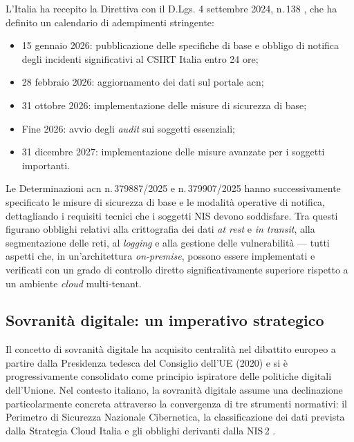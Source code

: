 L'Italia ha recepito la Direttiva con il D.Lgs. 4 settembre 2024, n.\,138 \parencite{DLgs138_2024}, che ha definito un calendario di adempimenti stringente:

\begin{itemize}[noitemsep]
  \item 15 gennaio 2026: pubblicazione delle specifiche di base e obbligo di notifica degli incidenti significativi al CSIRT Italia entro 24 ore;
  \item 28 febbraio 2026: aggiornamento dei dati sul portale \gls{acn};
  \item 31 ottobre 2026: implementazione delle misure di sicurezza di base;
  \item Fine 2026: avvio degli \textit{audit} sui soggetti essenziali;
  \item 31 dicembre 2027: implementazione delle misure avanzate per i soggetti importanti.
\end{itemize}

Le Determinazioni \gls{acn} n.\,379887/2025 e n.\,379907/2025 \parencite{DeterminazioniACN2025} hanno successivamente specificato le misure di sicurezza di base e le modalità operative di notifica, dettagliando i requisiti tecnici che i soggetti NIS devono soddisfare. Tra questi figurano obblighi relativi alla crittografia dei dati \textit{at rest} e \textit{in transit}, alla segmentazione delle reti, al \textit{logging} e alla gestione delle vulnerabilità --- tutti aspetti che, in un'architettura \textit{on-premise}, possono essere implementati e verificati con un grado di controllo diretto significativamente superiore rispetto a un ambiente \textit{cloud} multi-tenant.

\subsection{Sovranità digitale: un imperativo strategico}

Il concetto di sovranità digitale ha acquisito centralità nel dibattito europeo a partire dalla Presidenza tedesca del Consiglio dell'UE (2020) e si è progressivamente consolidato come principio ispiratore delle politiche digitali dell'Unione. Nel contesto italiano, la sovranità digitale assume una declinazione particolarmente concreta attraverso la convergenza di tre strumenti normativi: il Perimetro di Sicurezza Nazionale Cibernetica, la classificazione dei dati prevista dalla Strategia Cloud Italia e gli obblighi derivanti dalla NIS\,2 \parencite{PerimetroCibernetico,StrategiaCloudItalia,NIS2Directive}.

